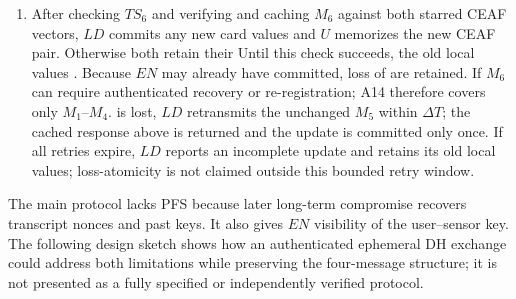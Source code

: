 \documentclass[cmc,article,submit,moreauthors,pdftex]{Definitions/tsp}
\providecommand{\DIFadd}[1]{{\protect\color{blue} \sf #1}} %
\providecommand{\DIFdel}[1]{{\protect\color{red} \scriptsize #1}} %
\providecommand{\DIFaddbegin}{} %
\providecommand{\DIFaddend}{} %
\providecommand{\DIFdelbegin}{} %
\providecommand{\DIFdelend}{} %
\begin{document}
\begin{enumerate}
\item After checking $TS_6$ and verifying \DIFdelbegin \DIFdel{and caching }\DIFdelend $M_6$ against both starred CEAF vectors, $LD$ commits any new card values and $U$ memorizes the new CEAF pair. \DIFdelbegin \DIFdel{Otherwise both retain their }\DIFdelend \DIFaddbegin \DIFadd{Until this check succeeds, the }\DIFaddend old local values \DIFdelbegin \DIFdel{. Because $EN$ may already have committed, loss of }\DIFdelend \DIFaddbegin \DIFadd{are retained. If }\DIFaddend $M_6$ \DIFdelbegin \DIFdel{can require authenticated recovery or re-registration; A14 therefore covers only $M_1$--$M_4$. }\DIFdelend \DIFaddbegin \DIFadd{is lost, $LD$ retransmits the unchanged $M_5$ within $\Delta T$; the cached response above is returned and the update is committed only once. If all retries expire, $LD$ reports an incomplete update and retains its old local values; loss-atomicity is not claimed outside this bounded retry window.
}\DIFaddend \end{enumerate}

\DIFdelbegin %

\DIFdel{The main protocol lacks PFS because later long-term compromise recovers transcript nonces and past keys. It also gives $EN$ visibility of the user--sensor key. The following design sketch shows how an authenticated ephemeral DH exchange could address both limitations while preserving the four-message structure; it is not presented as a fully specified or independently verified protocol. }%
\end{document}

